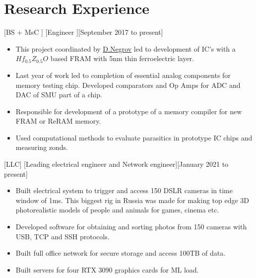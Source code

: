 \documentclass{article}
\begin{document}
\section{Research Experience}
 
[BS + MsC ]
[Engineer ][September 2017 to present]
 
\begin{itemize}
\item This project coordinated by  \href{https://www.scopus.com/authid/detail.uri?authorId=56272708000}{D.Negrov}   led to development of IC's with a $Hf_{0.5} Z_{0.5} O $ based  FRAM with 5nm thin ferroelectric layer.
\item Last year of work led to completion of essential analog components for memory testing chip. Developed comparators and Op Amps for ADC and DAC of SMU part of a chip.
\item Responsible for development of a prototype of a memory  compiler for new FRAM or ReRAM memory.
\item Used computational methods to evaluate parasitics in prototype IC chips and measuring zonds.
 
\end{itemize}
 
[LLC]
[Leading electrical engineer and Network engineer][January 2021 to present]
 
\begin{itemize}
   \item Built electrical system to trigger and access 150 DSLR cameras in time window of 1ms. This biggest rig in Russia was made for making top edge 3D photorealistic models of people and animals for games, cinema etc.
   \item Developed software for obtaining and sorting photos from 150 cameras with USB, TCP and SSH protocols.
   \item Built full office network for secure storage and access 100TB of data.
   \item Built servers for four RTX 3090 graphics cards for ML load. 
   \end{itemize}
 
\end{document}
